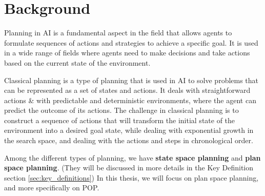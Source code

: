 \chapter{Background}\label{chap:background}
Planning in \acf{AI} is a fundamental aspect in the field that allows agents to formulate sequences of actions and strategies
to achieve a specific goal. It is used in a wide range of fields where agents need to make decisions and take actions based on the
current state of the environment.

Classical planning is a type of planning that is used in \ac{AI} to solve problems that can be represented as a set of states and actions.
It deals with straightforward actions \& with predictable and deterministic environments, where the agent can predict the outcome of its actions.
The challenge in classical planning is to construct a sequence of actions that will transform the initial state
of the environment into a desired goal state, while dealing with exponential growth in the search space, and dealing with the
actions and steps in chronological order.

Among the different types of planning, we have \textbf{state space planning} %
and \textbf{plan space planning}. (They will be discussed in more details in the Key Definition section \ref{sec:key_definitions}) %
In this thesis, we will focus on plan space planning, and more specifically on \acf{POP}.





